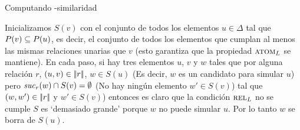 


\begin{algorithm}
\small
\caption{ Computando \EL-similaridad\label{alg:schematic-gen-sim}}
 \BlankLine


\end{algorithm}



%


Inicializamos $S(v)$ con
el conjunto de todos los elementos $u\in\Delta$ tal que $P(v)\subseteq
P(u)$, es decir, el conjunto de todos los elementos que cumplan al menos las
mismas relaciones unarias que $v$ (esto garantiza que la propiedad $\textsc{atom}_L$ se mantiene).
En cada paso, si hay tres elementos $u$, $v$ y $w$ tales que
por alguna relaci\'on $r$, $(u,v) \in |\!|r|\!|$, $w\in S(u)$
(Es decir, $w$ es un candidato para simular $u$) pero ${\it suc}_{r}(w)\cap S(v) = \emptyset$
(No hay ning\'un elemento $w'\in S(v)$) tal que $(w, w') \in |\!|r|\!|$
y $w'\in S(v)$) entonces es claro que la condici\'on $\textsc{rel}_L$ no se cumple $S$ es `demasiado grande' porque
$w$ no puede simular $u$. Por lo tanto $w$ se borra de $S(u)$.


